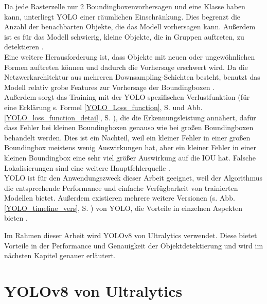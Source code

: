 {{	Da jede Rasterzelle nur 2 Boundingboxenvorhersagen und eine Klasse haben kann, unterliegt YOLO einer räumlichen Einschränkung. Dies begrenzt die Anzahl der benachbarten Objekte, die das Modell vorhersagen kann. Außerdem ist es für das Modell schwierig, kleine Objekte, die in Gruppen auftreten, zu detektieren \citep{Redmon2016}. \\
	Eine weitere Herausforderung ist, dass Objekte mit neuen oder ungewöhnlichen Formen auftreten können und dadurch die Vorhersage erschwert wird. Da die Netzwerkarchitektur aus mehreren \glqq Downsampling\grqq{}-Schichten besteht, benutzt das Modell relativ grobe Features zur Vorhersage der Boundingboxen \citep{Redmon2016}. \\
	Außerdem sorgt das Training mit der YOLO spezifischen Verlustfunktion (für eine Erklärung s.  Formel \ref{YOLO_Loss_function}, S. \pageref{YOLO_Loss_function} und Abb.  \ref{YOLO_loss_function_detail}, S. \pageref{YOLO_loss_function_detail}), die die Erkennungsleistung annähert, dafür dass Fehler bei kleinen Boundingboxen genauso wie bei großen Boundingboxen behandelt werden. Dies ist ein Nachteil, weil ein kleiner Fehler in einer großen Boundingbox meistens wenig Auswirkungen hat, aber ein kleiner Fehler in einer kleinen Boundingbox eine sehr viel größer Auswirkung auf die IOU hat. Falsche Lokalisierungen sind eine weitere Hauptfehlerquelle \citep{Redmon2016}. \\
	YOLO ist für den Anwendungszweck dieser Arbeit geeignet, weil der Algorithmus die entsprechende Performance und einfache Verfügbarkeit von trainierten Modellen bietet. Außerdem existieren mehrere weitere Versionen (s. Abb. \ref{YOLO_timeline_vers}, S. \pageref{YOLO_timeline_vers}) von YOLO, die Vorteile in einzelnen Aspekten bieten \citep{Terven2023}. 

	Im Rahmen dieser Arbeit wird YOLOv8 von Ultralytics verwendet. Diese bietet Vorteile in der Performance und Genauigkeit der Objektdetektierung und wird im nächsten Kapitel genauer erläutert. 
	} 

	\section{YOLOv8 von Ultralytics}{ \label{subsec:YOLOv8_theoretic}
	
}}
